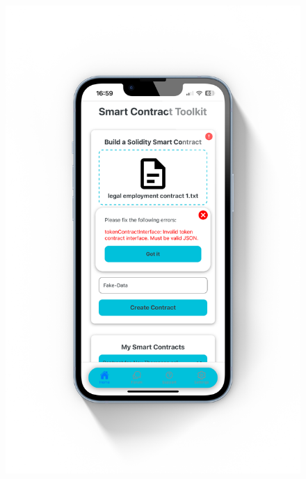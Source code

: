 \begin{figure}[!ht]
    \centering
    \begin{minipage}{0.5\textwidth}
        \centering
        \includegraphics[scale=0.08]{LATEX/Appendices/Images/Software/Frontend/home_screen_3.png}
        \label{fig:home screen 3}
    \end{minipage}\hfill %
    \begin{minipage}{0.5\textwidth}
        \centering

\end{minipage}
\end{figure}
